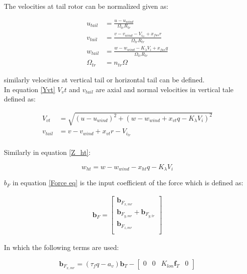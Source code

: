 The velocities at tail rotor can be normalized given as:

\begin{equation}
	\begin{aligned}
		u_{tail}&=\frac{u-u_{wind}}{\Omega_{tr} R_{tr} }\\
		v_{tail}&=\frac{v-v_{wind}-V_{i_{tr}}+x_{fus}r}{\Omega_{tr} R_{tr}} \\
		w_{tail}&= \frac{w-w_{wind}-K_{\lambda}V_i+x_{fus}q}{\Omega_{tr} R_{tr}}\\
		\Omega_{tr}&=n_{tr}\Omega  
	\end{aligned}
\end{equation}

similarly velocities at vertical tail or horizontal tail can be defined.\\ 
In equation \ref{Yvt} $V_vt$ and $v_{tail}$ are axial and normal velocities in vertical tale defined as:

\begin{equation}
	\begin{aligned}
		V_{vt}&=\sqrt{(u-u_{wind})^2+(w- w_{wind} +x_{vt}q-K_\lambda V_i)^2}\\
		v_{tail}&=v-v_{wind}+x_{vt}r-V_{i_{tr}} \\
	\end{aligned}
\end{equation}

Similarly in equation \ref{Z_ht}:

\begin{equation}
	w_{ht}=w-w_{wind}-x_{ht}q-K_{\lambda}V_i
\end{equation} 

$b_F$ in equation \ref{Force eq} is the input coefficient of the force which is defined as:

\begin{gather}\label{F_U}
	\textbf{b}_F
	=
	\begin{bmatrix}
		\textbf{b}_{F_{x,mr}}\\
		\textbf{b}_{F_{y,mr}}+\textbf{b}_{F_{y,tr}}\\
		\textbf{b}_{F_{z,mr}}\\
	\end{bmatrix}
\end{gather}

In which the following terms are used:

\begin{equation}
	\textbf{b}_{F_{x,mr}}=(\tau_f q-a_v)\textbf{b}_T-\begin{bmatrix}
		0&0&K_{lon}\textbf{f}_T&0
	\end{bmatrix}
\end{equation}


